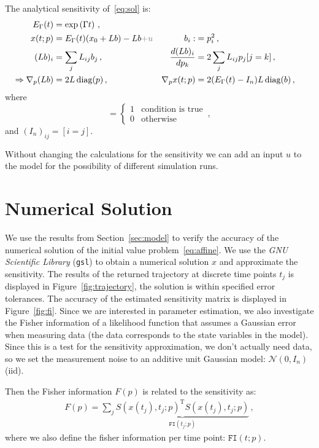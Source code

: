 \documentclass[utf8,english,DIV=12]{scrartcl}
\newcommand{\diag}{\text{diag}}
\newcommand{\grad}{\ensuremath{\nabla}}
\begin{document}
The analytical sensitivity of~\eqref{eq:sol} is:
\begin{align}
  E_\Gamma(t) &=\exp\left(\Gamma t\right)\,,\\
  x(t;p) &= E_\Gamma(t) (x_0 + Lb) - Lb {\color{gray}+ u}& b_i:&= p_i^2\,,\\
  (Lb)_i &=\sum_j L_{ij} b_j\,,& \frac{d(Lb)_i}{dp_k}&= 2\sum_j L_{ij}p_j [j=k]\,,\\
  \Rightarrow \grad_p(Lb) &= 2 L\,\diag(p)\,,&
  \grad_px(t;p) &=2 (E_\Gamma(t) -I_n)L\,\diag(b)\,,
\end{align}
where
\begin{equation}
  [\text{condition}] = \left\{
    \begin{array}{cl}
      1&\text{condition is true}\\
      0&\text{otherwise}
    \end{array}\right.\,,
  \label{eq:logical}
\end{equation}
and $(I_n)_{ij}=[i=j]$.

Without changing the calculations for the sensitivity we can add an input $u$ to the
model for the possibility of different simulation runs.

\section{Numerical Solution}
\label{sec:gsl}

We use the results from Section~\ref{sec:model} to verify the accuracy
of the numerical solution of the initial value
problem~\eqref{eq:affine}. We use the \emph{GNU Scientific Library} (\texttt{gsl}) to
obtain a numerical solution $x$ and approximate the sensitivity. The
results of the returned trajectory at discrete time points $t_j$ is
displayed in Figure~\ref{fig:trajectory}, the solution is within
specified error tolerances. The accuracy of the estimated sensitivity
matrix is displayed in Figure~\ref{fig:fi}. Since we are
interested in parameter estimation, we also investigate the Fisher
information of a likelihood function that assumes a Gaussian error
when measuring data (the data corresponds to the state variables in
the model). Since this is a test for the sensitivity approximation, we
don't actually need data, so we set the measurement noise to an additive unit
Gaussian model: $\mathcal{N}(0,I_n)$ (iid).

Then the Fisher information $F(p)$ is related to the sensitivity as:
\begin{align}
  F(p) = \sum_j \underbrace{S(x(t_j),t_j;p)^{\text{T}} S(x(t_j),t_j;p)}_{\texttt{FI}(t_j;p)}\,,
\end{align}
where we also define the fisher information per time point: $\texttt{FI}(t;p)$.
\end{document}
